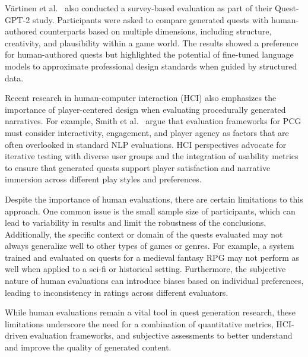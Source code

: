 Värtinen et al.~\cite{vartinen2022generating} also conducted a survey-based evaluation as part of their Quest-GPT-2
study. Participants were asked to compare generated quests with human-authored
counterparts based on multiple dimensions, including structure, creativity, and plausibility
within a game world. The results showed a preference for human-authored quests but
highlighted the potential of fine-tuned language models to approximate professional design
standards when guided by structured data.

Recent research in human-computer interaction (HCI) also emphasizes the importance
of player-centered design when evaluating procedurally generated narratives. For example,
Smith et al.~\cite{smith2011pcg} argue that evaluation frameworks for PCG must consider interactivity,
engagement, and player agency as factors that are often overlooked in standard NLP
evaluations. HCI perspectives advocate for iterative testing with diverse user groups
and the integration of usability metrics to ensure that generated quests support player
satisfaction and narrative immersion across different play styles and preferences.

Despite the importance of human evaluations, there are certain limitations to this
approach. One common issue is the small sample size of participants, which can lead to
variability in results and limit the robustness of the conclusions. Additionally, the specific
context or domain of the quests evaluated may not always generalize well to other types
of games or genres. For example, a system trained and evaluated on quests for a medieval
fantasy RPG may not perform as well when applied to a sci-fi or historical setting.
Furthermore, the subjective nature of human evaluations can introduce biases based on
individual preferences, leading to inconsistency in ratings across different evaluators.

While human evaluations remain a vital tool in quest generation research, these limitations
underscore the need for a combination of quantitative metrics, HCI-driven evaluation
frameworks, and subjective assessments to better understand and improve the quality of
generated content.

\newpage
